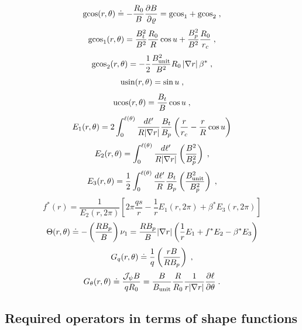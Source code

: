 %
\begin{equation}
\text{gcos}(r,\theta) \doteq -\frac{R_0}{B}\frac{\partial B}{\partial\varrho} 
= \text{gcos}_1 + \text{gcos}_2 \; , 
\end{equation} 
%
\begin{equation}
\text{gcos}_1(r,\theta) = \frac{B_t^2}{B^2}\frac{R_0}{R} \cos u +
\frac{B_p^2}{B^2}\frac{R_0}{r_c} \; ,
\end{equation}
%
\begin{equation}
\text{gcos}_2(r,\theta) = -\frac{1}{2}\frac{B_{\rm unit}^2}{B^2} R_0 
 \, |\nabla r| \, \beta^* \; ,
\end{equation}
%
\begin{equation}
\text{usin}(r,\theta) = \sin u \; ,
\end{equation}
%
\begin{equation}
\text{ucos}(r,\theta) = \frac{B_t}{B} \cos u \; ,
\end{equation}
%
\begin{equation}
E_1(r,\theta) = 2 \int_0^{\ell(\theta)} \frac{d\ell^\prime}{R |\nabla r|} \frac{B_t}{B_p} 
\left( \frac{r}{r_c} - \frac{r}{R} \cos u \right)
\end{equation}
%
\begin{equation}
E_2(r,\theta) = \int_0^{\ell(\theta)} \frac{d\ell^\prime}{R |\nabla r|} \left( 
\frac{B^2}{B_p^2} \right) \; ,
\end{equation}
%
\begin{equation}
E_3(r,\theta) = \frac{1}{2} \int_0^{\ell(\theta)} 
 \frac{d\ell^\prime}{R} \frac{B_t}{B_p} \left( 
 \frac{B_{\rm unit}^2}{B_p^2} \right) \; ,
\end{equation}
%
\begin{equation}
f^*(r) = \frac{1}{E_2(r,2\pi)} \left[ 2\pi \frac{q s}{r} - 
\frac{1}{r} E_1(r,2\pi) + \beta^*E_3(r,2\pi) \right] 
\end{equation}
%
\begin{equation}
\Theta(r,\theta) \doteq -\left( \frac{R B_p}{B} \right) \nu_1 
= \frac{R B_p}{B} |\nabla r| 
\left( \frac{1}{r} E_1 + f^* E_2 - \beta^* E_3 \right) 
\end{equation}
%
\begin{equation}
G_q(r,\theta) \doteq \frac{1}{q} \left(\frac{rB}{R B_p}\right) \; ,
\end{equation}
%
\begin{equation}
G_\theta(r,\theta) \doteq \frac{{\mathcal J}_\psi B}{q R_0} 
 = \frac{B}{B_{\rm unit}}\frac{R}{R_0} \frac{1}{r|\nabla r|} 
   \frac{\partial\ell}{\partial\theta} \; . 
\end{equation}

\subsection{Required operators in terms of shape functions}
\label{sec.shapefun}

